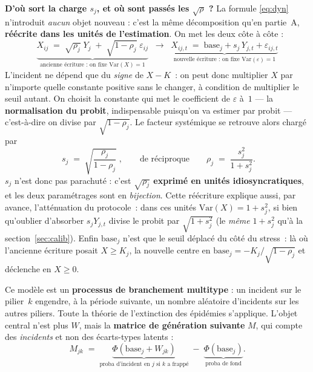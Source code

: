 \documentclass[11pt,a4paper]{article}
\newcommand{\Y}{Y}
\newcommand{\eps}{\varepsilon}
\begin{document}
\begin{cle}
\textbf{D'où sort la charge $s_j$, et où sont passés les $\sqrt{\rho}$ ?} La formule
\eqref{eq:dyn} n'introduit \emph{aucun} objet nouveau : c'est la même décomposition qu'en
partie~A, \textbf{réécrite dans les unités de l'estimation}. On met les deux côte à côte :
\[
\underbrace{X_{ij} \;=\; \sqrt{\rho_j}\;\Y_j \;+\; \sqrt{1-\rho_j}\;\eps_{ij}}_{\text{ancienne écriture : on fixe } \mathrm{Var}(X)=1}
\;\;\longrightarrow\;\;
\underbrace{X_{ij,t} \;=\; \text{base}_j + s_j\,\Y_{j,t} + \eps_{ij,t}}_{\text{nouvelle écriture : on fixe } \mathrm{Var}(\eps)=1}
\]
L'incident ne dépend que du \emph{signe} de $X-K$~: on peut donc multiplier $X$ par n'importe
quelle constante positive sans le changer, à condition de multiplier le seuil autant. On
choisit la constante qui met le coefficient de $\eps$ à~$1$ --- la \textbf{normalisation du
probit}, indispensable puisqu'on va estimer par probit --- c'est-à-dire on divise par
$\sqrt{1-\rho_j}$. Le facteur systémique se retrouve alors chargé par
\[
\boxed{\;s_j \;=\; \sqrt{\dfrac{\rho_j}{1-\rho_j}}\;}, \qquad\text{de réciproque}\qquad
\rho_j \;=\; \dfrac{s_j^2}{1+s_j^2}.
\]
$s_j$ n'est donc pas parachuté : c'est \textbf{$\sqrt{\rho_j}$ exprimé en unités
idiosyncratiques}, et les deux paramétrages sont en \emph{bijection}. Cette réécriture
explique aussi, par avance, l'atténuation du protocole~: dans ces unités
$\mathrm{Var}(X)=1+s_j^2$, si bien qu'oublier d'absorber $s_j\Y_{j,t}$ divise le probit par
$\sqrt{1+s_j^2}$ (le \emph{même} $1+s_j^2$ qu'à la section~\ref{sec:calib}). Enfin
$\text{base}_j$ n'est que le seuil déplacé du côté du stress~: là où l'ancienne écriture posait
$X\ge K_j$, la nouvelle centre en $\text{base}_j = -K_j/\sqrt{1-\rho_j}$ et déclenche en
$X\ge 0$.
\end{cle}

Ce modèle est un \textbf{processus de branchement multitype} : un incident sur le pilier~$k$
engendre, à la période suivante, un nombre aléatoire d'incidents sur les autres piliers. Toute
la théorie de l'extinction des épidémies s'applique. L'objet central n'est plus $W$, mais la
\textbf{matrice de génération suivante} $M$, qui compte des \emph{incidents} et non des
écarts-types latents :
\begin{equation}
M_{jk} \;=\; \underbrace{\Phi(\text{base}_j + W_{jk})}_{\text{proba d'incident en } j \text{ si } k \text{ a frappé}}
        \;-\; \underbrace{\Phi(\text{base}_j)}_{\text{proba de fond}} .
\end{equation}
\end{document}
